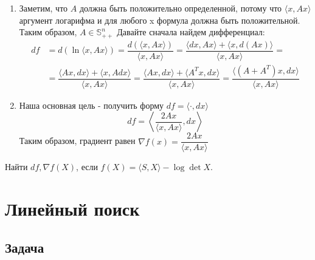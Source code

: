 \documentclass[
  russian,
  letterpaper,
  DIV=11,
  numbers=noendperiod]{scrartcl}
\providecommand{\tightlist}{%
  \setlength{\itemsep}{0pt}\setlength{\parskip}{0pt}}
\begin{document}
\begin{enumerate}
\def\labelenumi{\arabic{enumi}.}
\tightlist
\item
  Заметим, что \(A\) должна быть положительно определенной, потому что
  \(\langle x, Ax\rangle\) аргумент логарифма и для любого x формула
  должна быть положительной. Таким образом, \(A \in \mathbb{S}^n_{++}\)
  Давайте сначала найдем дифференциал: \[
  \begin{split}
   df &= d \left( \ln \langle x, Ax\rangle \right) = \dfrac{d \left( \langle x, Ax\rangle \right)}{ \langle x, Ax\rangle} = \dfrac{\langle dx, Ax\rangle +  \langle x, d(Ax)\rangle}{ \langle x, Ax\rangle} = \\
   &= \dfrac{\langle Ax, dx\rangle + \langle x, Adx\rangle}{ \langle x, Ax\rangle} = \dfrac{\langle Ax, dx\rangle + \langle A^T x, dx\rangle}{ \langle x, Ax\rangle} = \dfrac{\langle (A + A^T) x, dx\rangle}{ \langle x, Ax\rangle} 
  \end{split}
  \]
\item
  Наша основная цель - получить форму \(df = \langle \cdot, dx\rangle\)
  \[
  df = \left\langle  \dfrac{2 A x}{ \langle x, Ax\rangle} , dx\right\rangle
  \] Таким образом, градиент равен
  \(\nabla f(x) = \dfrac{2 A x}{ \langle x, Ax\rangle}\)
\end{enumerate}

\begin{tcolorbox}[enhanced jigsaw, colframe=quarto-callout-color-frame, coltitle=black, leftrule=.75mm, left=2mm, opacityback=0, bottomtitle=1mm, bottomrule=.15mm, colback=white, breakable, arc=.35mm, toptitle=1mm, colbacktitle=quarto-callout-color!10!white, title=\textcolor{quarto-callout-color}{\faInfo}\hspace{0.5em}{Example}, titlerule=0mm, rightrule=.15mm, opacitybacktitle=0.6, toprule=.15mm]

Найти \(df, \nabla f(X)\), если
\(f(X) = \langle S, X\rangle - \log \det X\).

\end{tcolorbox}

\section{Линейный
поиск}\label{ux43bux438ux43dux435ux439ux43dux44bux439-ux43fux43eux438ux441ux43a}

\subsection{Задача}\label{ux437ux430ux434ux430ux447ux430}
\end{document}
